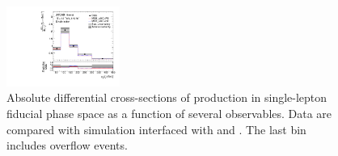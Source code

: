 \begin{figure}[ht]
  \includegraphics[width=0.33\textwidth]{figures/diff_xsec/absolute-unfolded-distributions/tty_prod_ljet/SL_tty_prod_ptj1_unfolded_absolute.pdf}%
  \caption{Absolute differential cross-sections of \tty production in single-lepton fiducial phase space as a function of several observables. Data are compared with \madgraph simulation interfaced with \pythia and \herwig. The last bin includes overflow events.}
  \label{fig:pt_unfolded_ljet_dist_realdata}
\end{figure}
\FloatBarrier



